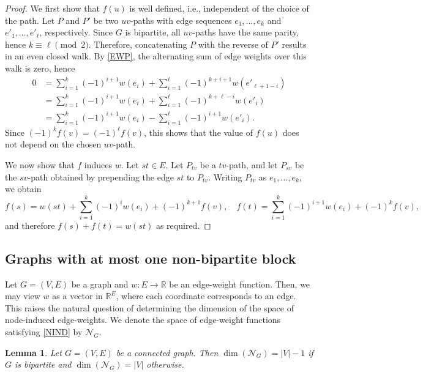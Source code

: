 \documentclass{article}
\theoremstyle{plain}
\newtheorem{lem}[thm]{Lemma}
\theoremstyle{definition}
\newcommand{\bR}{\mathbb{R}}
\begin{document}
\begin{proof}
    We first show that $f(u)$ is well defined, i.e., independent of the choice of the path. Let $P$ and $P'$ be two $uv$-paths with edge sequences $e_{1}, \dots, e_{k}$ and $e'_{1}, \dots, e'_{\ell}$, respectively. Since $G$ is bipartite, all $uv$-paths have the same parity, hence $k \equiv \ell \pmod 2$. Therefore, concatenating $P$ with the reverse of $P'$ results in an even closed walk. By \ref{EWP}, the alternating sum of edge weights over this walk is zero, hence
    \begin{align*}
        0
        &=
        \sum_{i=1}^{k} (-1)^{i+1} w(e_i)
        +\sum_{i=1}^{\ell} (-1)^{k+i+1} w(e'_{\ell+1-i})\\
        &=
        \sum_{i=1}^{k} (-1)^{i+1} w(e_i)
        +\sum_{i=1}^{\ell} (-1)^{k+\ell-i} w(e'_{i})\\
        &=
        \sum_{i=1}^{k} (-1)^{i+1} w(e_i)
        -\sum_{i=1}^{\ell} (-1)^{i+1} w(e'_{i}).
    \end{align*}
    Since $(-1)^k f(v)=(-1)^\ell f(v)$, this shows that the value of $f(u)$ does not depend on the chosen $uv$-path.
    
    We now show that $f$ induces $w$. Let $st \in E$. Let $P_{tv}$ be a $tv$-path, and let $P_{sv}$ be the $sv$-path obtained by prepending the edge $st$ to $P_{tv}$. Writing $P_{tv}$ as $e_{1}, \dots, e_{k}$, we obtain
    \[
        f(s) = w(st) + \sum_{i=1}^{k} (-1)^{i} w(e_i) + (-1)^{k+1} f(v),
    \quad
    f(t) = \sum_{i=1}^{k} (-1)^{i+1} w(e_i) + (-1)^k f(v),
    \]
    and therefore $f(s)+f(t)=w(st)$ as required.
\end{proof}


\subsection{Graphs with at most one non-bipartite block}
\label{sec:noodd}

Let $G=(V,E)$ be a graph and $w\colon E\to\bR$ be an edge-weight function. Then, we may view $w$ as a vector in $\mathbb{R}^{E}$, where each coordinate corresponds to an edge. This raises the natural question of determining the dimension of the space of node-induced edge-weights. We denote the space of edge-weight functions satisfying \ref{NIND} by $\mathcal{N}_G$. 

\begin{lem}\label{lem:space}
    Let $G = (V, E)$ be a connected graph. Then $\dim(\mathcal{N}_G) = |V| - 1$ if $G$ is bipartite and $\dim(\mathcal{N}_G) = |V|$ otherwise.
\end{lem}
\end{document}
